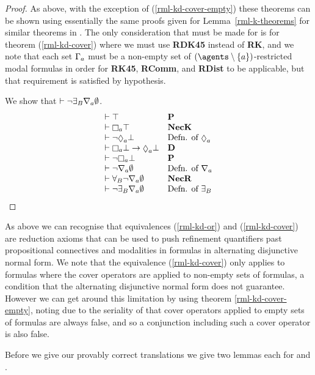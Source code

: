 \begin{proof}
As above, with the exception of (\ref{rml-kd-cover-empty}) these theorems can be shown using essentially the same proofs given for Lemma~\ref{rml-k-theorems} for similar theorems in \axiomRmlK{}.
The only consideration that must be made for \axiomRmlKD{} is for theorem (\ref{rml-kd-cover}) where we must use {\bf RDK45} instead of {\bf RK}, and we note that each set $\Gamma_a$ must be a non-empty set of $(\agents \setminus \{\agentA\})$-restricted modal formulas in order for {\bf RK45}, {\bf RComm}, and {\bf RDist} to be applicable, but that requirement is satisfied by hypothesis.

We show that $\vdash \lnot {\exists_{B}} \nabla_{a} \emptyset$.
$$
\begin{array}{ll}
    \proves \top & {\bf P}\\
    \proves \necessaryA \top & {\bf NecK}\\
    \proves \lnot \possibleA \bot & \text{Defn. of $\possibleA$}\\
    \proves \necessaryA \bot \implies \possibleA \bot & {\bf D}\\
    \proves \lnot \necessaryA \bot & {\bf P}\\
    \proves \lnot \coversA \emptyset & \text{Defn. of $\coversA$}\\
    \proves \allrefsBs \lnot \coversA \emptyset & {\bf NecR}\\
    \proves \lnot \somerefsBs \coversA \emptyset & \text{Defn. of $\somerefsBs$}
\end{array}
$$
\end{proof}

As above we can recognise that equivalences (\ref{rml-kd-or}) and (\ref{rml-kd-cover}) are reduction axioms that can be used to push refinement quantifiers past propositional connectives and modalities in formulas in alternating disjunctive normal form.
We note that the equivalence (\ref{rml-kd-cover}) only applies to formulas where the cover operators are applied to non-empty sets of formulas, a condition that the alternating disjunctive normal form does not guarantee.
However we can get around this limitation by using theorem \ref{rml-kd-cover-empty}, noting due to the seriality of \classKD{} that cover operators applied to empty sets of formulas are always false, and so a conjunction including such a cover operator is also false.

Before we give our provably correct translations we give two lemmas each for \axiomRmlKFF{} and \axiomRmlKD{}.

